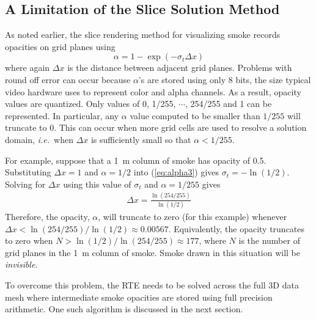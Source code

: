 {%

\subsection{A Limitation of the Slice Solution Method}
As noted earlier, the slice rendering method for visualizing smoke
records opacities on grid planes using
\begin{equation}
\label{eq:alpha3}
\alpha=1-\exp(-\sigma_t\Delta x)
\end{equation}
where again $\Delta x$ is the distance between adjacent grid
planes.  Problems with round off error can occur because
$\alpha$'s are stored using only 8 bits, the size typical video
hardware uses to represent color and alpha channels. As a result,
opacity values are quantized.  Only values of 0, 1/255, $\cdots$,
254/255 and 1 can be represented.  In particular, any $\alpha$
value computed to be smaller than $1/255$ will truncate to 0. This
can occur when more grid cells are used to resolve a solution
domain, {\em i.e.}\ when $\Delta x$ is sufficiently small so that
$\alpha<1/255$.

For example, suppose that a 1~m column of smoke has opacity of
0.5.  Substituting $\Delta x=1$ and $\alpha=1/2$ into
(\ref{eq:alpha3}) gives $\sigma_t=-\ln(1/2)$.  Solving for $\Delta
x$ using this value of $\sigma_t$ and $\alpha=1/255$ gives
\begin{eqnarray}
\Delta x = \frac{\ln(254/255)}{\ln(1/2)}
\end{eqnarray}
Therefore, the opacity, $\alpha$, will truncate to zero (for this
example) whenever $\Delta x<\ln(254/255)/\ln(1/2)\approx 0.00567$.
Equivalently, the opacity truncates to zero when
$N>\ln(1/2)/\ln(254/255)\approx 177$, where $N$ is the number of
grid planes in the 1~m column of smoke.  Smoke drawn in this
situation will be {\em invisible}.

To overcome this problem, the RTE needs to be solved across the
full 3D data mesh where intermediate smoke opacities are stored
using full precision arithmetic.  One such algorithm is discussed
in the next section.


}
